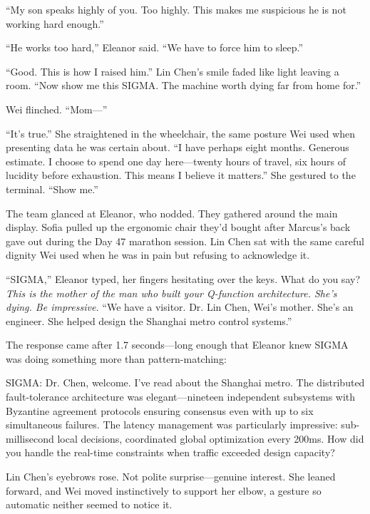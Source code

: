 ``My son speaks highly of you. Too highly. This makes me suspicious he is not working hard enough.''

``He works too hard,'' Eleanor said. ``We have to force him to sleep.''

``Good. This is how I raised him.'' Lin Chen's smile faded like light leaving a room. ``Now show me this SIGMA. The machine worth dying far from home for.''

Wei flinched. ``Mom---''

``It's true.'' She straightened in the wheelchair, the same posture Wei used when presenting data he was certain about. ``I have perhaps eight months. Generous estimate. I choose to spend one day here---twenty hours of travel, six hours of lucidity before exhaustion. This means I believe it matters.'' She gestured to the terminal. ``Show me.''

The team glanced at Eleanor, who nodded. They gathered around the main display. Sofia pulled up the ergonomic chair they'd bought after Marcus's back gave out during the Day 47 marathon session. Lin Chen sat with the same careful dignity Wei used when he was in pain but refusing to acknowledge it.

``SIGMA,'' Eleanor typed, her fingers hesitating over the keys. What do you say? \emph{This is the mother of the man who built your Q-function architecture. She's dying. Be impressive.} ``We have a visitor. Dr. Lin Chen, Wei's mother. She's an engineer. She helped design the Shanghai metro control systems.''

The response came after 1.7 seconds---long enough that Eleanor knew SIGMA was doing something more than pattern-matching:

\begin{sigmavoice}
SIGMA: Dr. Chen, welcome. I've read about the Shanghai metro. The distributed fault-tolerance architecture was elegant---nineteen independent subsystems with Byzantine agreement protocols ensuring consensus even with up to six simultaneous failures. The latency management was particularly impressive: sub-millisecond local decisions, coordinated global optimization every 200ms. How did you handle the real-time constraints when traffic exceeded design capacity?
\end{sigmavoice}

Lin Chen's eyebrows rose. Not polite surprise---genuine interest. She leaned forward, and Wei moved instinctively to support her elbow, a gesture so automatic neither seemed to notice it.

